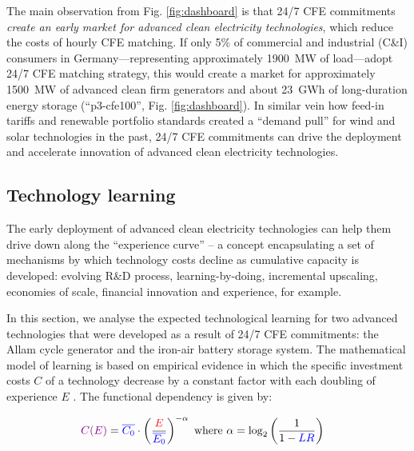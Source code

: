 \documentclass[pdflatex,sn-basic, Numbered]{sn-jnl}%
\theoremstyle{thmstyleone}%
\theoremstyle{thmstyletwo}%
\theoremstyle{thmstylethree}%
\begin{document}
The main observation from Fig. \ref{fig:dashboard} is that 24/7 CFE commitments \textit{create an early market for advanced clean electricity technologies}, which reduce the costs of hourly CFE matching. 
If only 5\% of commercial and industrial (C\&I) consumers in Germany---representing approximately 1900~MW of load---adopt 24/7 CFE matching strategy, this would create a market for approximately 1500~MW of advanced clean firm generators and about 23~GWh of long-duration energy storage (\enquote{p3-cfe100}, Fig. \ref{fig:dashboard}).
In similar vein how feed-in tariffs and renewable portfolio standards created a \enquote{demand pull} for wind and solar technologies in the past, 24/7 CFE commitments can drive the deployment and accelerate innovation of advanced clean electricity technologies.

\subsection*{Technology learning}\label{sec3}

The early deployment of advanced clean electricity technologies can help them drive down along the \enquote{experience curve} -- a concept encapsulating a set of mechanisms by which technology costs decline as cumulative capacity is developed: evolving R\&D process, learning-by-doing, incremental upscaling, economies of scale, financial innovation and experience, for example.

In this section, we analyse the expected technological learning for two advanced technologies that were developed as a result of 24/7 CFE commitments: the Allam cycle generator and the iron-air battery storage system. The mathematical model of learning is based on empirical evidence in which the speciﬁc investment costs $C$ of a technology decrease by a constant factor with each doubling of experience $E$ \cite{wayEmpiricallyGroundedTechnology2022a}. The functional dependency is given by:

\begin{equation}
  \begin{aligned}
    \color{violet}C(E)\color{black} &= \color{blue}\overline{C_0}\color{black}  \cdot \left( \frac{\color{red}E}{\color{blue}\overline{E_0}\color{black}} \right)^{-\color{black}\alpha} \text{ where } \color{black}\alpha = \color{black}\log_2 \left( \frac{1}{1 - \color{blue}LR\color{black}} \right)
    \label{eq:learning_curve}
  \end{aligned}
\end{equation}
\end{document}
